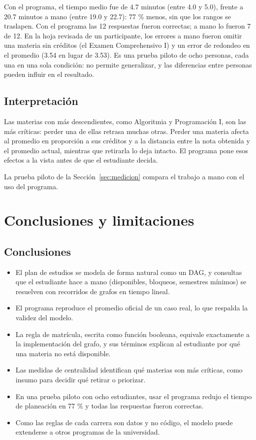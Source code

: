 \documentclass[11pt,a4paper]{article}
\begin{document}
Con el programa, el tiempo medio fue de 4.7 minutos (entre 4.0 y 5.0), frente a 20.7 minutos a mano (entre 19.0 y 22.7): 77 \% menos, sin que los rangos se traslapen. Con el programa las 12 respuestas fueron correctas; a mano lo fueron 7 de 12. En la hoja revisada de un participante, los errores a mano fueron omitir una materia sin créditos (el Examen Comprehensivo I) y un error de redondeo en el promedio (3.54 en lugar de 3.53). Es una prueba piloto de ocho personas, cada una en una sola condición: no permite generalizar, y las diferencias entre personas pueden influir en el resultado.

\subsection{Interpretación}
Las materias con más descendientes, como Algoritmia y Programación I, son las más críticas: perder una de ellas retrasa muchas otras. Perder una materia afecta al promedio en proporción a sus créditos y a la distancia entre la nota obtenida y el promedio actual, mientras que retirarla lo deja intacto. El programa pone esos efectos a la vista antes de que el estudiante decida.

La prueba piloto de la Sección~\ref{sec:medicion} compara el trabajo a mano con el uso del programa.

\section{Conclusiones y limitaciones}
\subsection{Conclusiones}
\begin{itemize}
  \item El plan de estudios se modela de forma natural como un DAG, y consultas que el estudiante hace a mano (disponibles, bloqueos, semestres mínimos) se resuelven con recorridos de grafos en tiempo lineal.
  \item El programa reproduce el promedio oficial de un caso real, lo que respalda la validez del modelo.
  \item La regla de matrícula, escrita como función booleana, equivale exactamente a la implementación del grafo, y sus términos explican al estudiante por qué una materia no está disponible.
  \item Las medidas de centralidad identifican qué materias son más críticas, como insumo para decidir qué retirar o priorizar.
  \item En una prueba piloto con ocho estudiantes, usar el programa redujo el tiempo de planeación en 77 \% y todas las respuestas fueron correctas.
  \item Como las reglas de cada carrera son datos y no código, el modelo puede extenderse a otros programas de la universidad.
\end{itemize}
\end{document}
